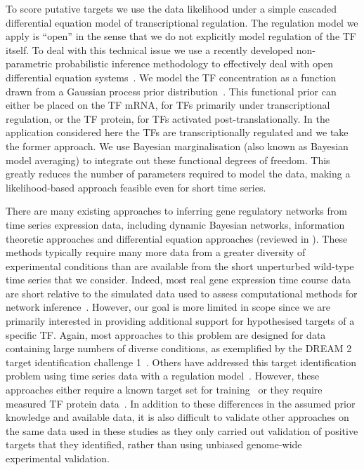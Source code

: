 \documentclass{pnastwo}
\begin{document}
\begin{article}
To score putative targets we use the data likelihood under a simple
cascaded differential equation model of transcriptional regulation. The regulation model
we apply is ``open'' in the sense that we do not explicitly model regulation of the TF
itself. To deal with this technical issue we use a recently developed
non-parametric probabilistic inference methodology to
effectively deal with open differential equation
systems~\cite{Gao2008}. We model the TF concentration as a function
drawn from a Gaussian process prior distribution~\cite{Rasmussen2006}. This functional prior can either be placed
on the TF mRNA, for TFs primarily under transcriptional regulation,
or the TF protein, for TFs activated post-translationally. In the
application considered here the TFs are transcriptionally regulated
and we take the former approach. We use Bayesian marginalisation (also
known as Bayesian model averaging) to
integrate out these functional degrees of freedom. This greatly reduces the
number of parameters required to model the data, making a
likelihood-based approach feasible even for short time series.

There are many existing approaches to inferring gene regulatory networks from
time series expression data, including dynamic Bayesian networks,
information theoretic approaches and differential equation approaches
(reviewed in \cite{Bansal2007a}). These methods typically require many
more data from a greater diversity of experimental conditions than are
available from the short unperturbed wild-type time series that we
consider. Indeed, most real gene expression time course data are short
relative to the simulated data used to assess computational methods
for network inference~\cite{Ernst2005}. However, our goal is more limited in scope since
we are primarily interested in providing additional support for hypothesised
targets of a specific TF. Again, most approaches to this problem are
designed for data containing large numbers of diverse conditions, as
exemplified by the DREAM 2 target identification
challenge 1~\cite{Stolovitzky2007}. Others
have addressed this target identification problem using time series
data with a regulation model~\cite{Barenco2006a,Gatta2008}. However,
these approaches either require a known target set for training~\cite{Barenco2006a} or
they require measured TF protein data~\cite{Gatta2008}. In addition to
these differences in the assumed prior knowledge and available data,
it is also difficult to validate other approaches on the same data used in these
studies as they only carried out validation of positive targets
that they identified, rather than using unbiased genome-wide
experimental validation. 


\end{article}
\end{document}
